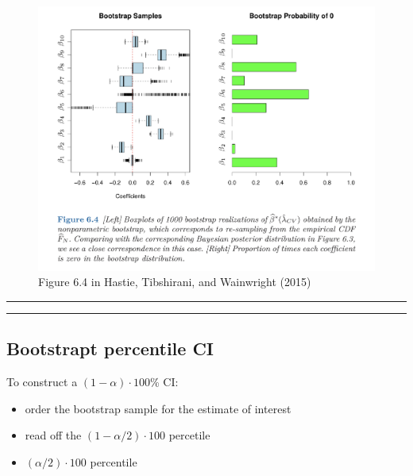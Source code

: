 \documentclass[
  letterpaper,
  DIV=11,
  numbers=noendperiod]{scrartcl}
\providecommand{\tightlist}{%
  \setlength{\itemsep}{0pt}\setlength{\parskip}{0pt}}\usepackage{longtable,booktabs,array}
\begin{document}
\begin{figure}

{\centering \includegraphics[width=1\textwidth,height=\textheight]{./HTWFig64.jpg}

}

\caption{Figure 6.4 in Hastie, Tibshirani, and Wainwright (2015)}

\end{figure}

\begin{center}\rule{0.5\linewidth}{0.5pt}\end{center}

\begin{center}\rule{0.5\linewidth}{0.5pt}\end{center}

\hypertarget{bootstrapt-percentile-ci}{%
\subsection{Bootstrapt percentile CI}\label{bootstrapt-percentile-ci}}

To construct a \((1-\alpha)\cdot 100\)\% CI:

\begin{itemize}
\tightlist
\item
  order the bootstrap sample for the estimate of interest
\item
  read off the \((1-\alpha/2)\cdot 100\) percetile
\item
  \((\alpha/2)\cdot 100\) percentile
\end{itemize}
\end{document}
